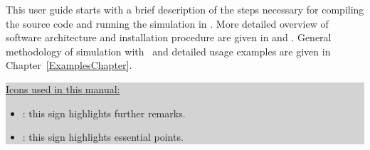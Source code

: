 

This user guide starts with a brief description of the steps necessary for compiling 
the source code and running
the simulation in . More detailed overview of software architecture and
installation procedure are given in  and .
General methodology of simulation with \BornAgain\ and detailed usage examples are given
in Chapter~\ref{ExamplesChapter}.%
\vspace*{2mm}

\colorbox{Lightgray}{\parbox{0.95\linewidth}
{
\noindent \underline{Icons used in this manual:}
\begin{itemize}
\item[] \smallpencil: this sign highlights further remarks.
\item[] {\huge\danger}: this sign highlights essential points.
\end{itemize}
}
}
